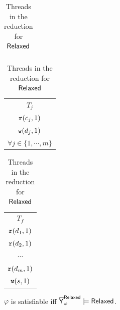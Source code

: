 \begin{table}[h]
\begin{minipage}{0.35\textwidth}
\begin{tabular}{c | c}
\end{tabular}
\end{minipage}
\hfill
\begin{minipage}{0.13\textwidth}
\centering
\begin{tabular}{c}
    $T_j$ \\
    $\mathtt{r}(c_j, 1)$\\
    $\mathtt{w}(d_j, 1)$ \\
    $\forall j \in \{1,\cdots,m\}$\\
\end{tabular}
\end{minipage}
\hfill
\begin{minipage}{0.13\textwidth}
\centering
\begin{tabular}{c}
    $T_f$ \\
    $\mathtt{r}(d_1, 1)$ \\
    $\mathtt{r}(d_2, 1)$ \\
    $\cdots$ \\
    $\mathtt{r}(d_m, 1)$ \\
    $\mathtt{w}(s, 1)$ \\
\end{tabular}
\end{minipage}
\vspace{2em}
\caption{Threads in the reduction for $\mathsf{Relaxed}$}
    \label{tab:np-reduction-threads-relaxed}
\end{table}

\begin{lemma}
    $\varphi$ is satisfiable iff $\overline{\mathsf{\color{black}Y}}_\varphi^{\mathsf{Relaxed}}  \models \mathsf{Relaxed}$.
\end{lemma}

